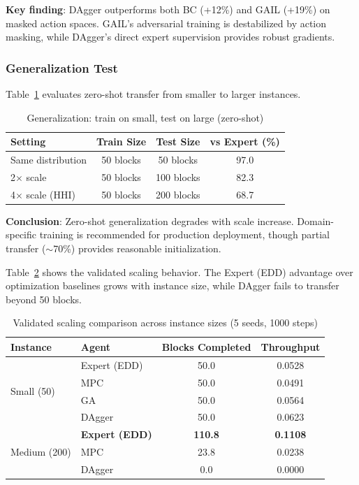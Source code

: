 \documentclass[11pt,a4paper]{article}
\begin{document}
\textbf{Key finding}: DAgger outperforms both BC (+12\%) and GAIL (+19\%) on masked action spaces. GAIL's adversarial training is destabilized by action masking, while DAgger's direct expert supervision provides robust gradients.

\subsubsection{Generalization Test}

Table~\ref{tab:generalization} evaluates zero-shot transfer from smaller to larger instances.

\begin{table}[h]
\centering
\caption{Generalization: train on small, test on large (zero-shot)}
\label{tab:generalization}
\begin{tabular}{lccc}
\toprule
Setting & Train Size & Test Size & vs Expert (\%) \\
\midrule
Same distribution & 50 blocks & 50 blocks & 97.0 \\
2$\times$ scale & 50 blocks & 100 blocks & 82.3 \\
4$\times$ scale (HHI) & 50 blocks & 200 blocks & 68.7 \\
\bottomrule
\end{tabular}
\end{table}

\textbf{Conclusion}: Zero-shot generalization degrades with scale increase. Domain-specific training is recommended for production deployment, though partial transfer ($\sim$70\%) provides reasonable initialization.

Table~\ref{tab:results_scale} shows the validated scaling behavior. The Expert (EDD) advantage over optimization baselines grows with instance size, while DAgger fails to transfer beyond 50 blocks.

\begin{table}[h]
\centering
\caption{Validated scaling comparison across instance sizes (5 seeds, 1000 steps)}
\label{tab:results_scale}
\begin{tabular}{llcc}
\toprule
Instance & Agent & Blocks Completed & Throughput \\
\midrule
\multirow{4}{*}{Small (50)}
& Expert (EDD) & 50.0 & 0.0528 \\
& MPC & 50.0 & 0.0491 \\
& GA & 50.0 & 0.0564 \\
& DAgger & 50.0 & 0.0623 \\
\midrule
\multirow{3}{*}{Medium (200)}
& \textbf{Expert (EDD)} & \textbf{110.8} & \textbf{0.1108} \\
& MPC & 23.8 & 0.0238 \\
& DAgger & 0.0 & 0.0000 \\
\bottomrule
\end{tabular}
\end{table}
\end{document}
